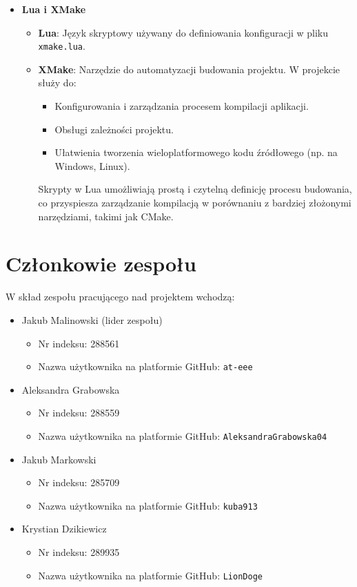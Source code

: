 \documentclass{article}
\begin{document}
\begin{itemize}
    \item \textbf{Lua i XMake}
    \begin{itemize}
        \item \textbf{Lua}: Język skryptowy używany do definiowania konfiguracji w pliku \texttt{xmake.lua}.
        \item \textbf{XMake}: Narzędzie do automatyzacji budowania projektu. W projekcie służy do:
        \begin{itemize}
            \item Konfigurowania i zarządzania procesem kompilacji aplikacji.
            \item Obsługi zależności projektu.
            \item Ułatwienia tworzenia wieloplatformowego kodu źródłowego (np. na Windows, Linux).
        \end{itemize}
        Skrypty w Lua umożliwiają prostą i czytelną definicję procesu budowania, co przyspiesza zarządzanie kompilacją w porównaniu z bardziej złożonymi narzędziami, takimi jak CMake.
    \end{itemize}
\end{itemize}

\section{Członkowie zespołu}
W skład zespołu pracującego nad projektem wchodzą:

\begin{itemize}
    \item Jakub Malinowski (lider zespołu)
    \begin{itemize}
        \item Nr indeksu: 288561
        \item Nazwa użytkownika na platformie GitHub: \texttt{at-eee}
    \end{itemize}
    \item Aleksandra Grabowska 
    \begin{itemize}
        \item Nr indeksu: 288559
        \item Nazwa użytkownika na platformie GitHub: \texttt{AleksandraGrabowska04}
    \end{itemize}
    \item Jakub Markowski
    \begin{itemize}
        \item Nr indeksu: 285709
        \item Nazwa użytkownika na platformie GitHub: \texttt{kuba913}
    \end{itemize}
    \item Krystian Dzikiewicz
    \begin{itemize}
        \item Nr indeksu: 289935
        \item Nazwa użytkownika na platformie GitHub: \texttt{LionDoge}
    \end{itemize}
\end{itemize}
\end{document}
